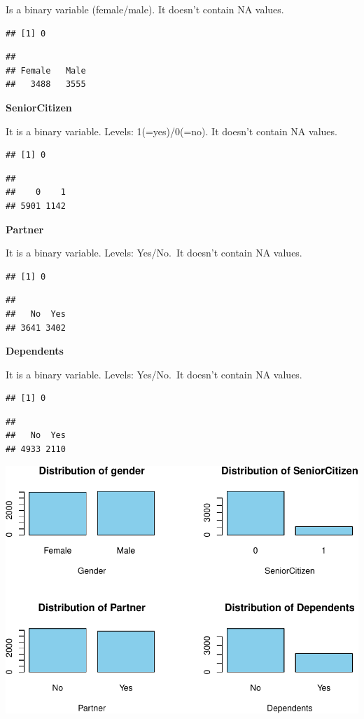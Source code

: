 \documentclass[
  twoside]{article}
\begin{document}
Is a binary variable (female/male). It doesn't contain NA values.

\begin{verbatim}
## [1] 0
\end{verbatim}

\begin{verbatim}
## 
## Female   Male 
##   3488   3555
\end{verbatim}

\textbf{SeniorCitizen}

It is a binary variable. Levels: 1(=yes)/0(=no). It doesn't contain NA
values.

\begin{verbatim}
## [1] 0
\end{verbatim}

\begin{verbatim}
## 
##    0    1 
## 5901 1142
\end{verbatim}

\textbf{Partner}

It is a binary variable. Levels: Yes/No.~It doesn't contain NA values.

\begin{verbatim}
## [1] 0
\end{verbatim}

\begin{verbatim}
## 
##   No  Yes 
## 3641 3402
\end{verbatim}

\textbf{Dependents}

It is a binary variable. Levels: Yes/No.~It doesn't contain NA values.

\begin{verbatim}
## [1] 0
\end{verbatim}

\begin{verbatim}
## 
##   No  Yes 
## 4933 2110
\end{verbatim}

\includegraphics{Assigment2_files/figure-latex/unnamed-chunk-8-1.pdf}
\end{document}
